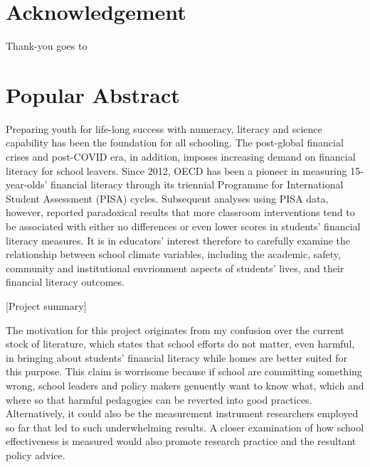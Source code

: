 \documentclass[a4paper,11pt,UKenglish,twoside,openright]{report}\usepackage[]{graphicx}\usepackage[]{color}
\begin{document}

\setcounter{page}{0}

\tableofcontents

\listoftables

\listoffigures



\doublespacing


\chapter*{Acknowledgement}
\label{Ac}

Thank-you goes to


\chapter*{Popular Abstract}
\label{Ab.0}

Preparing youth for life-long success with numeracy, literacy and science capability has been the foundation for all schooling. The post-global financial crises and post-COVID era, in addition, imposes increasing demand on financial literacy for school leavers. Since 2012, OECD has been a pioneer in measuring 15-year-olds' financial literacy through its triennial Programme for International Student Assessment (PISA) cycles. Subsequent analyses using PISA data, however, reported paradoxical results that more classroom interventions tend to be associated with either no differences or even lower scores in students' financial literacy measures. It is in educators' interest therefore to carefully examine the relationship between school climate variables, including the academic, safety, community and institutional envrionment aspects of students' lives, and their financial literacy outcomes.

[Project summary]

The motivation for this project originates from my confusion over the current stock of literature, which states that school efforts do not matter, even harmful, in bringing about students' financial literacy while homes are better suited for this purpose. This claim is worrisome because if school are committing something wrong, school leaders and policy makers genuently want to know what, which and where so that harmful pedagogies can be reverted into good practices. Alternatively, it could also be the measurement instrument researchers employed so far that led to such underwhelming results. A closer examination of how school effectiveness is measured would also promote research practice and the resultant policy advice.
\end{document}
